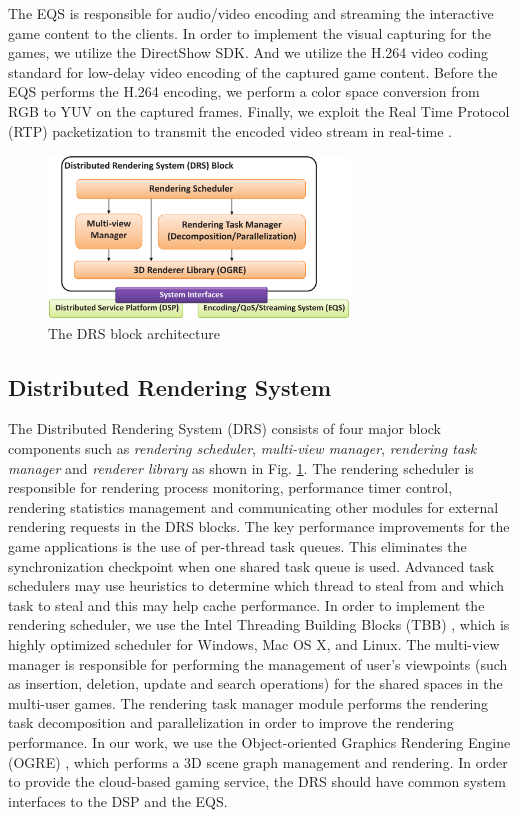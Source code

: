 \documentclass[conference]{IEEEtran}
\begin{document}
    The EQS is responsible for audio/video encoding and streaming the interactive game content to the clients.
    In order to implement the visual capturing for the games, we utilize the DirectShow SDK.
    And we utilize the H.264 video coding standard for low-delay video encoding of the captured game content.
    Before the EQS performs the H.264 encoding, we perform a color space conversion from RGB to YUV on the captured frames.
    Finally, we exploit the Real Time Protocol (RTP) packetization to transmit the encoded video stream in real-time \cite{RTP50}\cite{RTP84}.
    \begin{figure}[htb] %
    \centering
    \includegraphics[width=8cm, keepaspectratio]{DRSblock}
    \caption{The DRS block architecture}
    \label{fig:DRS}
    \end{figure}

    \subsection{Distributed Rendering System}
    \label{sub:DRS}
    The Distributed Rendering System (DRS) consists of four major block components such as \emph{rendering scheduler}, \emph{multi-view manager}, \emph{rendering task manager} and \emph{renderer library} as shown in Fig. \ref{fig:DRS}. The rendering scheduler is responsible for rendering process monitoring, performance timer control, rendering statistics management and communicating other modules for external rendering requests in the DRS blocks. The key performance improvements for the game applications is the use of per-thread task queues. This eliminates the synchronization checkpoint when one shared task queue is used.
    Advanced task schedulers may use heuristics to determine which thread to steal from and which task to steal and this may help cache performance.
    In order to implement the rendering scheduler, we use the Intel Threading Building Blocks (TBB) \cite{TBB:2010}, which is highly optimized scheduler for Windows, Mac OS X, and Linux.
    The multi-view manager is responsible for performing the management of user's viewpoints (such as insertion, deletion, update and search operations) for the shared spaces in the multi-user games.
    The rendering task manager module performs the rendering task decomposition and parallelization in order to improve the rendering performance.
    In our work, we use the Object-oriented Graphics Rendering Engine (OGRE) \cite{OGRE:2010}, which performs a 3D scene graph management and rendering.
    In order to provide the cloud-based gaming service, the DRS should have common system interfaces to the DSP and the EQS.
\end{document}
